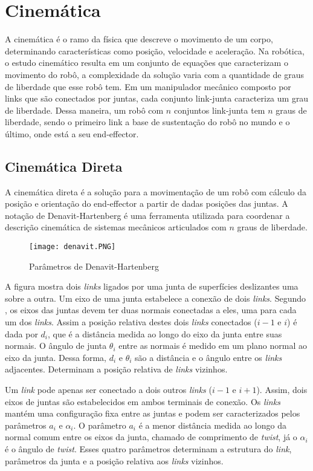 \section{Cinemática}\label{sec:cinem}
A cinemática é o ramo da física que descreve o movimento de um corpo, determinando características como posição, velocidade e aceleração. Na robótica, o estudo cinemático resulta em um conjunto de equações que caracterizam o movimento do robô, a complexidade da solução varia com a quantidade de graus de liberdade que esse robô tem. Em um manipulador mecânico composto por links que são conectados por juntas, cada conjunto link-junta caracteriza um grau de liberdade. Dessa maneira, um robô com $n$ conjuntos link-junta tem $n$ graus de liberdade, sendo o primeiro link a base de sustentação do robô no mundo e o último, onde está a seu end-effector.

\subsection{Cinemática Direta}\label{sec:cinem_dir}
A cinemática direta é a solução para a movimentação de um robô com cálculo da posição e orientação do end-effector a partir de dadas posições das juntas. A notação de Denavit-Hartenberg é uma ferramenta utilizada para coordenar a descrição cinemática de sistemas mecânicos articulados com $n$ graus de liberdade.

\begin{figure}[h!]												
	\centering												
	\texttt{[image: denavit.PNG]}			
	\caption{Parâmetros de Denavit-Hartenberg}		
	\label{img:denavit}	
\end{figure}

A figura mostra dois \textit{links} ligados por uma junta de superfícies deslizantes uma sobre a outra. Um eixo de uma junta estabelece a conexão de dois \textit{links}. Segundo \cite{romanorobotica}, os eixos das juntas devem ter duas normais conectadas a eles, uma para cada um dos \textit{links}. Assim a posição relativa destes dois \textit{links} conectados ($i-1$ e $i$) é dada por $d_{i}$, que é a distância medida ao longo do eixo da junta entre suas normais. O ângulo de junta $\theta_{i}$ entre as normais é medido em um plano normal ao eixo da junta. Dessa forma, $d_{i}$ e $\theta_{i}$ são a distância e o ângulo entre os \textit{links} adjacentes. Determinam a posição relativa de \textit{links} vizinhos.

Um \textit{link} pode apenas ser conectado a dois outros \textit{links} ($i-1$ e $i+1$). Assim, dois eixos de juntas são estabelecidos em ambos terminais de conexão. Os \textit{links} mantém uma configuração fixa entre as juntas e podem ser caracterizados pelos parâmetros $a_{i}$ e $\alpha_{i}$. O parâmetro $a_{i}$ é a menor distância medida ao longo da normal comum entre os eixos da junta, chamado de comprimento de \textit{twist}, já o $\alpha_{i}$ é o ângulo de \textit{twist}. Esses quatro parâmetros determinam a estrutura do \textit{link}, parâmetros da junta e a posição relativa aos \textit{links} vizinhos.

